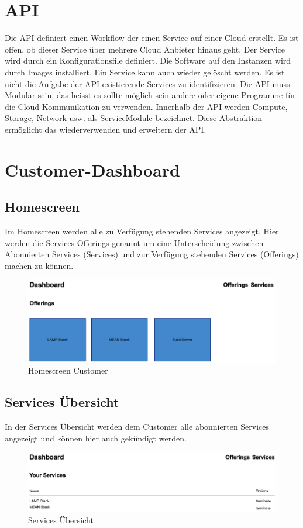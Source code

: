 \section{API}
Die API definiert einen Workflow der einen Service auf einer Cloud erstellt. Es ist offen, ob 
dieser Service über mehrere Cloud Anbieter hinaus geht. Der Service wird durch 
ein Konfigurationsfile definiert. Die Software auf den Instanzen wird durch Images installiert.
 Ein Service kann auch wieder gelöscht werden.
 Es ist nicht die Aufgabe der API existierende Services zu identifizieren. 
 Die API muss Modular sein, das heisst es sollte möglich sein andere oder eigene 
 Programme für die Cloud Kommunikation zu verwenden. Innerhalb der API 
 werden Compute, Storage, Network usw. als ServiceModule bezeichnet. 
 Diese Abstraktion ermöglicht das wiederverwenden und erweitern der API.
\newpage
\section{Customer-Dashboard}
\subsection{Homescreen}
Im Homescreen werden alle zu 
Verfügung stehenden Services angezeigt.
Hier werden die Services Offerings genannt um eine Unterscheidung zwischen 
Abonnierten Services (Services) und zur Verfügung stehenden Services (Offerings) 
machen zu können.
\newline
\begin{figure}[!htbp]
\includegraphics[width=\textwidth]{./04_Anforderungen/images/homescreen_customer}
\caption{Homescreen Customer}
\end{figure}

\subsection{Services Übersicht}
In der Services Übersicht werden dem Customer alle abonnierten Services 
angezeigt und können hier auch gekündigt werden.
\newline
\begin{figure}[!htbp]
\includegraphics[width=\textwidth]{./04_Anforderungen/images/services_overview}
\caption{Services Übersicht}
\end{figure}

